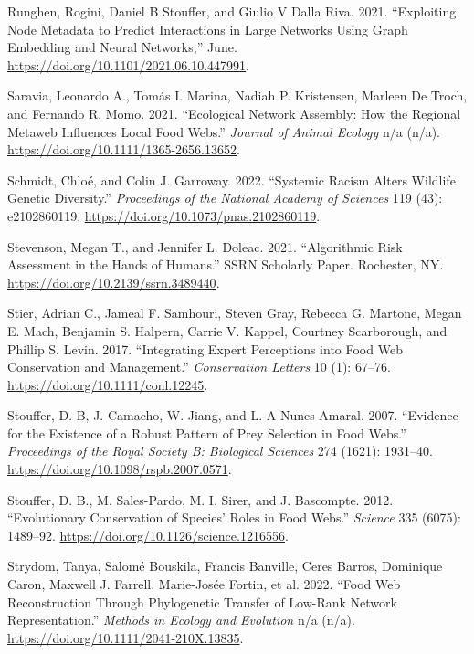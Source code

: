 \documentclass[
  letterpaper,
  DIV=11,
  numbers=noendperiod]{scrartcl}
\newlength{\cslhangindent}
\newlength{\cslentryspacingunit} %
\newenvironment{CSLReferences}[2] %
 {%
  \setlength{\parindent}{0pt}
  \ifodd #1
  \let\oldpar\par
  \def\par{\hangindent=\cslhangindent\oldpar}
  \fi
  \setlength{\parskip}{#2\cslentryspacingunit}
 }%
 {}
\begin{document}
\begin{CSLReferences}{1}{0}
\leavevmode{}%
Runghen, Rogini, Daniel B Stouffer, and Giulio V Dalla Riva. 2021.
{``Exploiting Node Metadata to Predict Interactions in Large Networks
Using Graph Embedding and Neural Networks,''} June.
\url{https://doi.org/10.1101/2021.06.10.447991}.

\leavevmode{}%
Saravia, Leonardo A., Tomás I. Marina, Nadiah P. Kristensen, Marleen De
Troch, and Fernando R. Momo. 2021. {``Ecological Network Assembly: {How}
the Regional Metaweb Influences Local Food Webs.''} \emph{Journal of
Animal Ecology} n/a (n/a).
\url{https://doi.org/10.1111/1365-2656.13652}.

\leavevmode{}%
Schmidt, Chloé, and Colin J. Garroway. 2022. {``Systemic Racism Alters
Wildlife Genetic Diversity.''} \emph{Proceedings of the National Academy
of Sciences} 119 (43): e2102860119.
\url{https://doi.org/10.1073/pnas.2102860119}.

\leavevmode{}%
Stevenson, Megan T., and Jennifer L. Doleac. 2021. {``Algorithmic {Risk
Assessment} in the {Hands} of {Humans}.''} SSRN Scholarly Paper.
{Rochester, NY}. \url{https://doi.org/10.2139/ssrn.3489440}.

\leavevmode{}%
Stier, Adrian C., Jameal F. Samhouri, Steven Gray, Rebecca G. Martone,
Megan E. Mach, Benjamin S. Halpern, Carrie V. Kappel, Courtney
Scarborough, and Phillip S. Levin. 2017. {``Integrating {Expert
Perceptions} into {Food Web Conservation} and {Management}.''}
\emph{Conservation Letters} 10 (1): 67--76.
\url{https://doi.org/10.1111/conl.12245}.

\leavevmode{}%
Stouffer, D. B, J. Camacho, W. Jiang, and L. A Nunes Amaral. 2007.
{``Evidence for the Existence of a Robust Pattern of Prey Selection in
Food Webs.''} \emph{Proceedings of the Royal Society B: Biological
Sciences} 274 (1621): 1931--40.
\url{https://doi.org/10.1098/rspb.2007.0571}.

\leavevmode{}%
Stouffer, D. B., M. Sales-Pardo, M. I. Sirer, and J. Bascompte. 2012.
{``Evolutionary {Conservation} of {Species}' {Roles} in {Food Webs}.''}
\emph{Science} 335 (6075): 1489--92.
\url{https://doi.org/10.1126/science.1216556}.

\leavevmode{}%
Strydom, Tanya, Salomé Bouskila, Francis Banville, Ceres Barros,
Dominique Caron, Maxwell J. Farrell, Marie-Josée Fortin, et al. 2022.
{``Food Web Reconstruction Through Phylogenetic Transfer of Low-Rank
Network Representation.''} \emph{Methods in Ecology and Evolution} n/a
(n/a). \url{https://doi.org/10.1111/2041-210X.13835}.


\end{CSLReferences}
\end{document}
